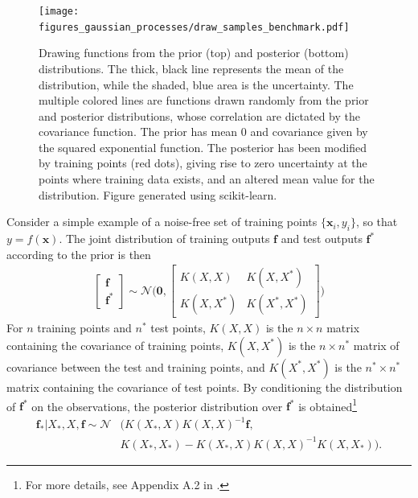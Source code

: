 \documentclass[twoside,english]{uiofysmaster}
\begin{document}
\begin{figure}
\centering
\texttt{[image: figures\_gaussian\_processes/draw\_samples\_benchmark.pdf]}
\caption{Drawing functions from the prior (top) and posterior (bottom) distributions. The thick, black line represents the mean of the distribution, while the shaded, blue area is the uncertainty. The multiple colored lines are functions drawn randomly from the prior and posterior distributions, whose correlation are dictated by the covariance function. The prior has mean 0 and covariance given by the squared exponential function. The posterior has been modified by training points (red dots), giving rise to zero uncertainty at the points where training data exists, and an altered mean value for the distribution. Figure generated using scikit-learn.}
\label{Fig:: gaussian process : prior posterior drawn samples}
\end{figure}

Consider a simple example of a noise-free set of training points $\{\textbf{x}_i, y_i\}$, so that $y = f(\textbf{x})$. The joint distribution of training outputs $\textbf{f}$ and test outputs $\textbf{f}^*$ according to the prior is then
\begin{align}
\begin{bmatrix}
\textbf{f}\\
\textbf{f}^*
\end{bmatrix}
\sim 
\mathcal{N} \Bigg(
\boldsymbol{0},
\begin{bmatrix}
K(X, X) & K(X, X^*)\\
K(X, X^*) & K(X^*, X^*)
\end{bmatrix}
 \Bigg)
\end{align}
For $n$ training points and $n^*$ test points, $K(X,X)$ is the $n \times n$ matrix containing the covariance of training points, $K(X, X^*)$ is the $n \times n^*$ matrix of covariance between the test and training points, and $K(X^*, X^*)$ is the $n^* \times n^*$ matrix containing the covariance of test points. By conditioning the distribution of $\textbf{f}^*$ on the observations,  the posterior distribution over $\textbf{f}^*$ is obtained\footnote{For more details, see Appendix A.2 in \cite{rasmussen2006gaussian}.}  \cite{rasmussen2006gaussian} 
\begin{align}
\textbf{f}_* \big| X_*, X, \textbf{f} \sim \mathcal{N}&(K(X_*, X)K(X, X)^{-1} \textbf{f},\\ &K(X_*, X_*) - K(X_*, X)K(X, X)^{-1}K(X, X_*)).
\end{align}
\end{document}
